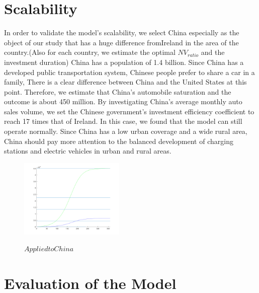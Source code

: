\documentclass{mcmthesis}
\begin{document}
\section{Scalability}
In order to validate the model's scalability, we select China especially as the object of our study that has a huge difference from ​​Ireland in the area of the country.(Also for each country, we estimate the optimal $NV_{ratio}$ and the investment duration) China has a population of 1.4 billion. Since China has a developed public transportation system, Chinese people prefer to share a car in a family, There is a clear difference between China and the United States at this point. Therefore, we estimate that China's automobile saturation and the outcome is about 450 million. By investigating China's average monthly auto sales volume, we set the Chinese government's investment efficiency coefficient to reach 17 times that of Ireland. In this case, we found that the model can still operate normally. Since China has a low urban coverage and a wide rural area, China should pay more attention to the balanced development of charging stations and electric vehicles in urban and rural areas.
\begin{figure}[htbp]
	\centering
	\includegraphics[width=5cm]{img/china.png}\\
	\caption{$Applied to China$}
	\label{Figure7}
\end{figure}
\section{Evaluation of the Model}
\end{document}
